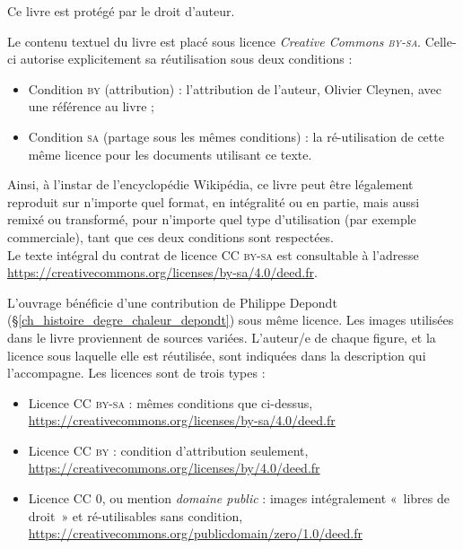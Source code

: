 {\setlength{\parindent}{0pt}
	Ce livre est protégé par le droit d’auteur.

	Le contenu textuel du livre est placé sous licence \textit{Creative Commons \textsc{by-sa}}. Celle-ci autorise explicitement sa réutilisation sous deux conditions : 
	\begin{itemize}
		\renewcommand\labelitemi{\ccAttribution}
		\item Condition \textsc{by} (attribution) : l’attribution de l’auteur, Olivier Cleynen, avec une référence au livre ;
		\renewcommand\labelitemi{\ccShareAlike}
		\item Condition \textsc{sa} (partage sous les mêmes conditions) : la ré-utilisation de cette même licence pour les documents utilisant ce texte.
	\end{itemize}

	Ainsi, à l’instar de l’encyclopédie Wikipédia, ce livre peut être légalement reproduit sur n’importe quel format, en intégralité ou en partie, mais aussi remixé ou transformé, pour n’importe quel type d’utilisation (par exemple commerciale), tant que ces deux conditions sont respectées.\\
	Le texte intégral du contrat de licence \textsc{CC by-sa} est consultable à l’adresse \href{https://creativecommons.org/licenses/by-sa/4.0/deed.fr}{https://creativecommons.org/licenses/by-sa/4.0/deed.fr}.

	L’ouvrage bénéficie d’une contribution de Philippe Depondt (\S\ref{ch_histoire_degre_chaleur_depondt}) sous même licence. Les images utilisées dans le livre proviennent de sources variées. L’auteur/e de chaque figure, et la licence sous laquelle elle est réutilisée, sont indiquées dans la description qui l’accompagne. Les licences sont de trois types : 
	\begin{itemize}
		\item Licence \textsc{CC by-sa} : mêmes conditions que ci-dessus,\\
					\href{https://creativecommons.org/licenses/by-sa/4.0/deed.fr}{https://creativecommons.org/licenses/by-sa/4.0/deed.fr}
		\item Licence \textsc{CC by} : condition d’attribution seulement,\\
					\href{https://creativecommons.org/licenses/by/4.0/deed.fr}{https://creativecommons.org/licenses/by/4.0/deed.fr}
		\item Licence \textsc{CC 0}, ou mention \textit{domaine public} : images intégralement «~libres de droit~» et ré-utilisables sans condition,\\
					\href{https://creativecommons.org/publicdomain/zero/1.0/deed.fr}{https://creativecommons.org/publicdomain/zero/1.0/deed.fr}
	\end{itemize}

}
